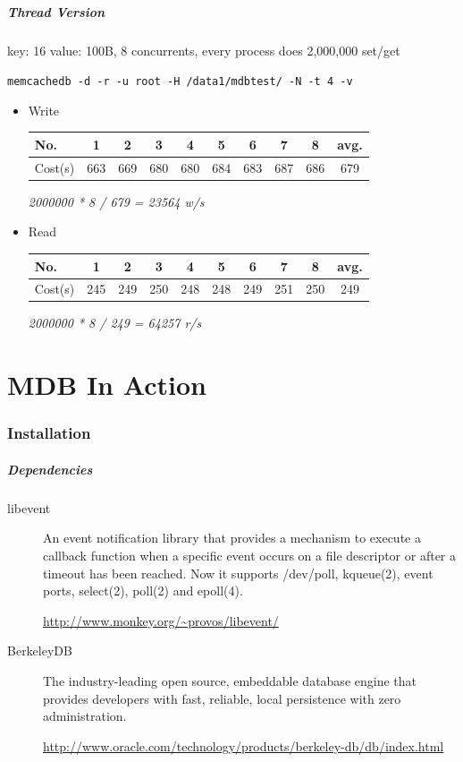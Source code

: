 \documentclass{beamer}
\newcommand{\mypart}[1]{\part{#1}\frame{\partpage \tableofcontents}}
\newcommand{\mysection}[1]{\section{#1}\frame{\frametitle{#1}\tableofcontents[sectionstyle=show/shaded,subsectionstyle=show/shaded/shaded]}}
\begin{document}
\begin{frame}
\frametitle{Thread Version}
key: 16 value: 100B, 8 concurrents, every process does 2,000,000 set/get
\begin{block}{}
\texttt{memcachedb -d -r -u root -H /data1/mdbtest/ -N -t 4 -v}
\end{block}
\begin{itemize}
\item Write
\begin{tabular}{l|c|c|c|c|c|c|c|c|c} \hline
No.      & 1   & 2   & 3   & 4   & 5   & 6   & 7   & 8   &  avg.\\ \hline
Cost(s)  & 663 & 669 & 680 & 680 & 684 & 683 & 687 & 686 &  679 \\ \hline
\end{tabular}
\begin{center}\textit{2000000 * 8 / 679 = 23564 w/s}\end{center}
\item Read
\begin{tabular}{l|c|c|c|c|c|c|c|c|c} \hline
No.      & 1   & 2   & 3   & 4   & 5   & 6   & 7   & 8   &  avg.\\ \hline
Cost(s)  & 245 & 249 & 250 & 248 & 248 & 249 & 251 & 250 &  249 \\ \hline
\end{tabular}
\begin{center}\textit{2000000 * 8 / 249 = 64257 r/s}\end{center}
\end{itemize}
\end{frame}

\mypart{MDB In Action}
\mysection{Installation}
\begin{frame}
\frametitle{Dependencies}
\begin{description}
\item[libevent]
  An event notification library that provides a mechanism to execute a callback function when a specific event occurs on a file descriptor or after a timeout has been reached. Now it supports /dev/poll, kqueue(2), event ports, select(2), poll(2) and epoll(4).

  \url{http://www.monkey.org/~provos/libevent/}

\item[BerkeleyDB]
  The industry-leading open source, embeddable database engine that provides developers with fast, reliable, local persistence with zero administration.

  \url{http://www.oracle.com/technology/products/berkeley-db/db/index.html}

\end{description}
\end{frame}
\end{document}
